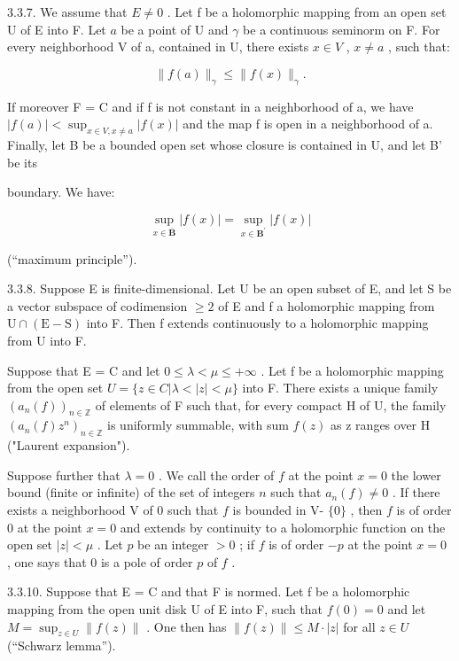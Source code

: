 3.3.7. We assume that \(E \neq 0\) . Let f be a holomorphic mapping from an open set U of E into F. Let \(a\) be a point of U and \(\gamma\) be a continuous seminorm on F. For every neighborhood V of a, contained in U, there exists \(x \in V\) , \(x \neq a\) , such that:

\[
\| f (a) \| _ {\gamma} \leqslant \| f (x) \| _ {\gamma}.
\]

If moreover F = C and if f is not constant in a neighborhood of a, we have \(|f(a)| < \sup_{x \in V, x \neq a} |f(x)|\) and the map f is open in a neighborhood of a. Finally, let B be a bounded open set whose closure is contained in U, and let B' be its

boundary. We have:

\[
\sup _ {x \in \overline {{\mathbf {B}}}} | f (x) | = \sup _ {x \in \mathbf {B} ^ {\prime}} | f (x) |
\]

(“maximum principle”).

3.3.8. Suppose E is finite-dimensional. Let U be an open subset of E, and let S be a vector subspace of codimension \(\geqslant2\) of E and f a holomorphic mapping from \(\mathrm{U}\cap(\mathrm{E}-\mathrm{S})\) into F. Then f extends continuously to a holomorphic mapping from U into F.

Suppose that E = C and let \(0 \leqslant \lambda < \mu \leqslant +\infty\) . Let f be a holomorphic mapping from the open set \(U = \{z \in C | \lambda < |z| < \mu\}\) into F. There exists a unique family \((a_{n}(f))_{n \in \mathbb{Z}}\) of elements of F such that, for every compact H of U, the family \((a_{n}(f)z^{n})_{n \in \mathbb{Z}}\) is uniformly summable, with sum \(f(z)\) as z ranges over H ("Laurent expansion").

Suppose further that \(\lambda=0\) . We call the order of \(f\) at the point \(x=0\) the lower bound (finite or infinite) of the set of integers \(n\) such that \(a_{n}(f)\neq0\) . If there exists a neighborhood V of 0 such that \(f\) is bounded in V- \(\{0\}\) , then \(f\) is of order 0 at the point \(x=0\) and extends by continuity to a holomorphic function on the open set \(|z|<\mu\) . Let \(p\) be an integer \(>0\) ; if \(f\) is of order \(-p\) at the point \(x=0\) , one says that 0 is a pole of order \(p\) of \(f\) .

3.3.10. Suppose that E = C and that F is normed. Let f be a holomorphic mapping from the open unit disk U of E into F, such that \(f(0) = 0\) and let \(M = \sup_{z \in U} \|f(z)\|\) . One then has \(\|f(z)\| \leqslant M \cdot |z|\) for all \(z \in U\) (“Schwarz lemma”).

